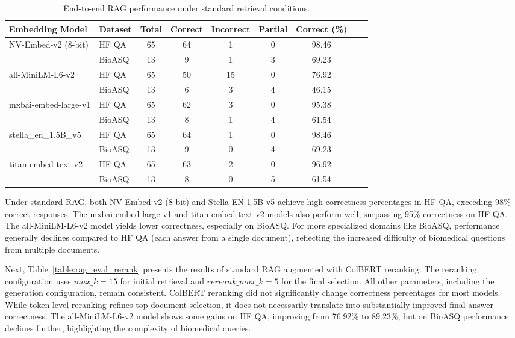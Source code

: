 \documentclass{scrartcl}
\begin{document}
\begin{table}[H]
\centering
\small
\begin{tabular}{l l c c c c c c c}
\hline
\textbf{Embedding Model} & \textbf{Dataset} & \textbf{Total} & \textbf{Correct} & \textbf{Incorrect} & \textbf{Partial} & \textbf{Correct (\%)} \\
\hline
\multirow{2}{*}{NV-Embed-v2 (8-bit)} 
 & HF QA  & 65 & 64 & 1 & 0 & 98.46 \\
 & BioASQ & 13 & 9  & 1 & 3 & 69.23 \\
\hline
\multirow{2}{*}{all-MiniLM-L6-v2} 
 & HF QA  & 65 & 50 & 15 & 0 & 76.92 \\
 & BioASQ & 13 & 6  & 3  & 4 & 46.15 \\
\hline
\multirow{2}{*}{mxbai-embed-large-v1} 
 & HF QA  & 65 & 62 & 3 & 0 & 95.38 \\
 & BioASQ & 13 & 8  & 1 & 4 & 61.54 \\
\hline
\multirow{2}{*}{stella\_en\_1.5B\_v5} 
 & HF QA  & 65 & 64 & 1 & 0 & 98.46 \\
 & BioASQ & 13 & 9  & 0 & 4 & 69.23 \\
\hline
\multirow{2}{*}{titan-embed-text-v2} 
 & HF QA  & 65 & 63 & 2 & 0 & 96.92 \\
 & BioASQ & 13 & 8  & 0 & 5 & 61.54 \\
\hline
\end{tabular}
\caption{End-to-end RAG performance under standard retrieval conditions.}
\label{table:rag_eval_standard}
\end{table}

Under standard RAG, both NV-Embed-v2 (8-bit) and Stella EN 1.5B v5 achieve high correctness percentages in HF QA, exceeding 98\% correct responses. The mxbai-embed-large-v1 and titan-embed-text-v2 models also perform well, surpassing 95\% correctness on HF QA. The all-MiniLM-L6-v2 model yields lower correctness, especially on BioASQ. For more specialized domains like BioASQ, performance generally declines compared to HF QA (each answer from a single document), reflecting the increased difficulty of biomedical questions from multiple documents.

Next, Table~\ref{table:rag_eval_rerank} presents the results of standard RAG augmented with ColBERT reranking. The reranking configuration uses $max\_k=15$ for initial retrieval and $rereank\_max\_k=5$ for the final selection. All other parameters, including the generation configuration, remain consistent. ColBERT reranking did not significantly change correctness percentages for most models. While token-level reranking refines top document selection, it does not necessarily translate into substantially improved final answer correctness. The all-MiniLM-L6-v2 model shows some gains on HF QA, improving from 76.92\% to 89.23\%, but on BioASQ performance declines further, highlighting the complexity of biomedical queries.
\end{document}
